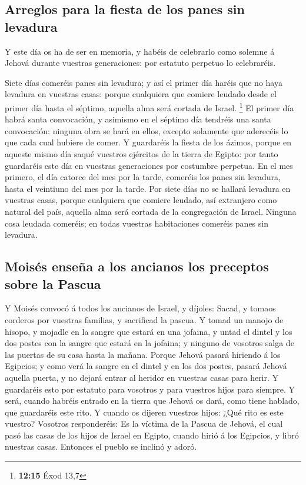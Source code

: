 \hypertarget{arreglos-para-la-fiesta-de-los-panes-sin-levadura}{%
\subsection{Arreglos para la fiesta de los panes sin
levadura}\label{arreglos-para-la-fiesta-de-los-panes-sin-levadura}}

 Y este día os ha de ser en memoria, y habéis de celebrarlo
como solemne á Jehová durante vuestras generaciones: por estatuto
perpetuo lo celebraréis.

 Siete días comeréis panes sin levadura; y así el primer
día haréis que no haya levadura en vuestras casas: porque cualquiera que
comiere leudado desde el primer día hasta el séptimo, aquella alma será
cortada de Israel. \footnote{\textbf{12:15} Éxod 13,7}  El
primer día habrá santa convocación, y asimismo en el séptimo día
tendréis una santa convocación: ninguna obra se hará en ellos, excepto
solamente que aderecéis lo que cada cual hubiere de comer. 
Y guardaréis la fiesta de los ázimos, porque en aqueste mismo día saqué
vuestros ejércitos de la tierra de Egipto: por tanto guardaréis este día
en vuestras generaciones por costumbre perpetua.  En el mes
primero, el día catorce del mes por la tarde, comeréis los panes sin
levadura, hasta el veintiuno del mes por la tarde.  Por
siete días no se hallará levadura en vuestras casas, porque cualquiera
que comiere leudado, así extranjero como natural del país, aquella alma
será cortada de la congregación de Israel.  Ninguna cosa
leudada comeréis; en todas vuestras habitaciones comeréis panes sin
levadura.

\hypertarget{moisuxe9s-enseuxf1a-a-los-ancianos-los-preceptos-sobre-la-pascua}{%
\subsection{Moisés enseña a los ancianos los preceptos sobre la
Pascua}\label{moisuxe9s-enseuxf1a-a-los-ancianos-los-preceptos-sobre-la-pascua}}

 Y Moisés convocó á todos los ancianos de Israel, y
díjoles: Sacad, y tomaos corderos por vuestras familias, y sacrificad la
pascua.  Y tomad un manojo de hisopo, y mojadle en la
sangre que estará en una jofaina, y untad el dintel y los dos postes con
la sangre que estará en la jofaina; y ninguno de vosotros salga de las
puertas de su casa hasta la mañana.  Porque Jehová pasará
hiriendo á los Egipcios; y como verá la sangre en el dintel y en los dos
postes, pasará Jehová aquella puerta, y no dejará entrar al heridor en
vuestras casas para herir.  Y guardaréis esto por estatuto
para vosotros y para vuestros hijos para siempre.  Y será,
cuando habréis entrado en la tierra que Jehová os dará, como tiene
hablado, que guardaréis este rito.  Y cuando os dijeren
vuestros hijos: ¿Qué rito es este vuestro?  Vosotros
responderéis: Es la víctima de la Pascua de Jehová, el cual pasó las
casas de los hijos de Israel en Egipto, cuando hirió á los Egipcios, y
libró nuestras casas. Entonces el pueblo se inclinó y adoró.

